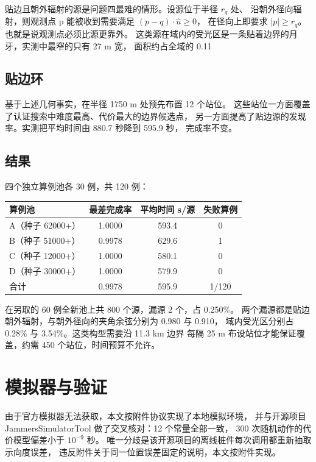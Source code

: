 贴边且朝外辐射的源是问题四最难的情形。设源位于半径 $r_q$ 处、
沿朝外径向辐射，则观测点 p 能被收到需要满足 $(p-q)\cdot \hat u \ge 0$，
在径向上即要求 $|p| \ge r_q$。也就是说观测点必须比源更靠外。
这类源在域内的受光区是一条贴着边界的月牙，实测中最窄的只有 27 m 宽，
面积约占全域的 0.11%

\subsection{贴边环}

基于上述几何事实，在半径 1750 m 处预先布置 12 个站位。
这些站位一方面覆盖了认证搜索中难度最高、代价最大的边界候选点，
另一方面提高了贴边源的发现率。实测把平均时间由 880.7 秒降到 595.9 秒，
完成率不变。

\subsection{结果}

四个独立算例池各 30 例，共 120 例：

\begin{center}
\begin{tabular}{lccc}
\toprule
算例池 & 最差完成率 & 平均时间 s/源 & 失败算例 \\
\midrule
A（种子 62000+） & 1.0000 & 593.4 & 0 \\
B（种子 51000+） & 0.9978 & 629.6 & 1 \\
C（种子 12000+） & 1.0000 & 580.1 & 0 \\
D（种子 30000+） & 1.0000 & 579.9 & 0 \\
\midrule
合计 & 0.9978 & 595.9 & 1/120 \\
\bottomrule
\end{tabular}
\end{center}

在另取的 60 例全新池上共 800 个源，漏源 2 个，占 0.250\%。
两个漏源都是贴边朝外辐射，与朝外径向的夹角余弦分别为 0.980 与 0.910，
域内受光区分别占 0.28\% 与 3.54\%。这类构型需要沿 11.3 km 边界
每隔 25 m 布设站位才能保证覆盖，约需 450 个站位，时间预算不允许。

\section{模拟器与验证}

由于官方模拟器无法获取，本文按附件协议实现了本地模拟环境，
并与开源项目 Jammers\-Simulator\-Tool 做了交叉核对：12 个常量全部一致，
300 次随机动作的代价模型偏差小于 $10^{-9}$ 秒。
唯一分歧是该开源项目的离线桩件每次调用都重新抽取示向度误差，
违反附件关于同一位置误差固定的说明，本文按附件实现。

